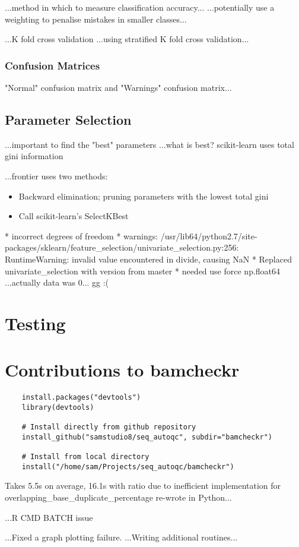 ...method in which to measure classification accuracy...
...potentially use a weighting to penalise mistakes in smaller classes...

...K fold cross validation
...using stratified K fold cross validation...

\subsubsection{Confusion Matrices}
"Normal" confusion matrix and "Warnings" confusion matrix...

\subsection{Parameter Selection}
...important to find the "best" parameters
...what is best? scikit-learn uses total gini information

...frontier uses two methods:
\begin{itemize}
    \item Backward elimination; pruning parameters with the lowest total gini
    \item Call scikit-learn's SelectKBest
\end{itemize}


* incorrect degrees of freedom
* warnings: /usr/lib64/python2.7/site-packages/sklearn/feature\_selection/univariate\_selection.py:256: RuntimeWarning: invalid value encountered in divide, causing NaN
* Replaced univariate\_selection with version from master
* needed use force np.float64
...actually data was 0... gg :(

\section{Testing}

\section{Contributions to bamcheckr}
\begin{verbatim}
    install.packages("devtools")
    library(devtools)

    # Install directly from github repository
    install_github("samstudio8/seq_autoqc", subdir="bamcheckr")

    # Install from local directory
    install("/home/sam/Projects/seq_autoqc/bamcheckr")

\end{verbatim}
Takes 5.5s on average, 16.1s with ratio due to inefficient implementation
for overlapping\_base\_duplicate\_percentage
re-wrote in Python...


...R CMD BATCH issue

...Fixed a graph plotting failure.
...Writing additional routines...



